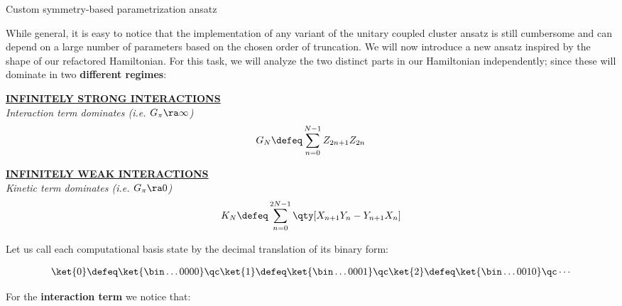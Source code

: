 \begin{frame}[allowframebreaks]{Custom symmetry-based parametrization ansatz}

	While general, it is easy to notice that the implementation of any variant of the unitary coupled cluster ansatz is still cumbersome and can depend on a large number of parameters based on the chosen order of truncation. We will now introduce a new ansatz inspired by the shape of our refactored Hamiltonian. For this task, we will analyze the two distinct parts in our Hamiltonian independently; since these will dominate in two \textbf{different regimes}:

	\begin{multicols}{2}

		\begin{center}
			\underline{\textbf{INFINITELY STRONG INTERACTIONS}}\\
			\small{\emph{Interaction term dominates (i.e. $G_{\pi} \ra \infty$)}}
			\begin{gather*}
				G_{N} \defeq \sum_{n=0}^{N-1} Z_{2n+1}Z_{2n}
			\end{gather*}
		\end{center}

		\columnbreak

		\begin{center}
			\underline{\textbf{INFINITELY WEAK INTERACTIONS}}\\
			\small{\emph{Kinetic term dominates (i.e. $G_{\pi} \ra 0$)}}
			\begin{gather*}
			  K_{N} \defeq \sum_{n=0}^{2N-1} \qty[ X_{n+1}Y_{n} - Y_{n+1}X_{n} ]
			\end{gather*}
		\end{center}

	\end{multicols}

	Let us call each computational basis state by the decimal translation of its binary form:

	\begin{gather*}
	  \ket{0} \defeq \ket{\bin\dots0000} \qc
	  \ket{1} \defeq \ket{\bin\dots0001} \qc
	  \ket{2} \defeq \ket{\bin\dots0010} \qc
	  \cdots
	\end{gather*}

\break

	For the \textbf{interaction term} we notice that:


\end{frame}
